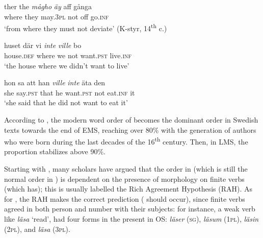 \documentclass[output=paper]{langscibook}
\begin{document}
\ea\label{ex:intro:5}
\ea\label{ex:intro:5a}
\gll  ther     the \textit{mågho} \textit{äy} aff   gånga                \\
where   they   may.3\textsc{pl}   not   off   go\textsc{.inf}\\
\glt ‘from where they must not deviate’ (K-styr, 14\textsuperscript{th} c.)


\ex\label{ex:intro:5b}
\gll  huset       där     vi \textit{inte} \textit{ville} {bo}\\
        house.\textsc{def}     where   we     not   want.\textsc{pst}  live.\textsc{inf}\\
\glt        ‘the house where we didn’t want to live’


\ex\label{ex:intro:5c}
\gll  hon   sa   att   han   \textit{ville}       \textit{inte}   äta     den    \\
        she         say.\textsc{pst} that he   want.\textsc{pst}  not   eat.\textsc{inf}  it\\
\glt         ‘she said that he did not want to eat it’
\z
\z

According to \citet[176]{Falk1993}, the modern  word order of  becomes the dominant order in Swedish texts towards the end of EMS, reaching over 80\% with the generation of authors who were born during the last decades of the 16\textsuperscript{th} century. Then, in LMS, the proportion stabilizes above 90\%.



Starting with \citet{Kosmeijer1986}, many scholars have argued that the order in  (which is still the normal order in ) is dependent on the presence of  morphology on finite verbs (which  has); this is usually labelled the Rich Agreement Hypothesis (RAH). As for , the RAH makes the correct prediction ( should occur), since finite verbs agreed in both person and number with their subjects: for instance, a weak verb like \textit{läsa} ‘read’, had four forms in the present  in OS: \textit{läser} (\textsc{sg}), \textit{läsum} (1\textsc{pl}), \textit{läsin} (2\textsc{pl}), and \textit{läsa} (3\textsc{pl}).
\end{document}

